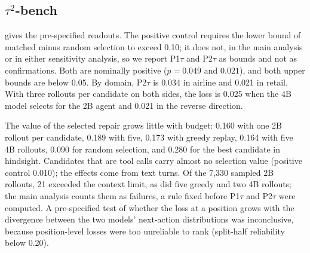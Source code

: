 \documentclass{article}
\newcommand{\tautwo}{$\tau^2$-bench}
\theoremstyle{plain}
\theoremstyle{definition}
\theoremstyle{remark}
\begin{document}
\subsection{\texorpdfstring{$\tau^2$}{tau2}-bench}
\label{app:tau2}

\begin{table}[!htbp]
  \caption{\tautwo{}, Qwen3.5-2B deployed (115 failed conversations, 96 tasks). Net gain of the selected repair for the 2B agent; matched selection uses five of its ten rollouts per branch and is scored on the other five. 90\% intervals from a bootstrap over tasks, stratified by domain. Sensitivity: an admissibility rule without the authentication condition; and dropping the six conversations with unscored rollouts.}
  \label{tab:tau2}
  \centering
  \footnotesize
  \setlength{\tabcolsep}{3pt}
\end{table}

 gives the pre-specified readouts. The positive control requires the lower bound of matched minus random selection to exceed 0.10; it does not, in the main analysis or in either sensitivity analysis, so we report P1$\tau$ and P2$\tau$ as bounds and not as confirmations. Both are nominally positive ($p=0.049$ and $0.021$), and both upper bounds are below 0.05. By domain, P2$\tau$ is 0.034 in airline and 0.021 in retail. With three rollouts per candidate on both sides, the loss is 0.025 when the 4B model selects for the 2B agent and 0.021 in the reverse direction.

The value of the selected repair grows little with budget: 0.160 with one 2B rollout per candidate, 0.189 with five, 0.173 with greedy replay, 0.164 with five 4B rollouts, 0.090 for random selection, and 0.280 for the best candidate in hindsight. Candidates that are tool calls carry almost no selection value (positive control 0.010); the effects come from text turns. Of the 7,330 sampled 2B rollouts, 21 exceeded the context limit, as did five greedy and two 4B rollouts; the main analysis counts them as failures, a rule fixed before P1$\tau$ and P2$\tau$ were computed. A pre-specified test of whether the loss at a position grows with the divergence between the two models' next-action distributions was inconclusive, because position-level losses were too unreliable to rank (split-half reliability below 0.20).
\end{document}
